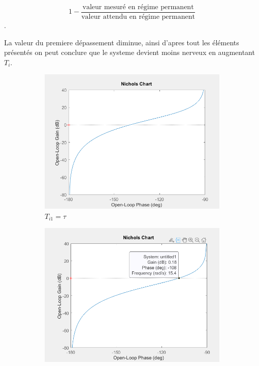 \documentclass[12pt, a4paper]{report}
\begin{document}
\[
    1 - \frac{\mbox{valeur mesuré en régime permanent}}{\mbox{valeur attendu en régime permanent}} 
\].

La valeur du premiere dépassement diminue, ainsi d'apres tout les éléments présentés on peut conclure que le systeme
devient moins nerveux en augmentant $T_i$.

\begin{figure}[H]
    \begin{subfigure}[h!]{0.46\linewidth}
        \includegraphics[width=\linewidth]{diagrammblacks1tau1.png}
        \caption{$T_{i1} = \tau$}
    \end{subfigure}
    \hfill
    \begin{subfigure}[h!]{0.46\linewidth}
        \includegraphics[width=\linewidth]{diagrammblacks1tau5.png}

\end{subfigure}
\end{figure}
\end{document}
